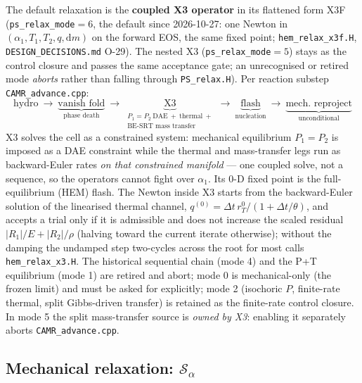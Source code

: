 \documentclass[11pt,a4paper]{article}
\newcommand{\code}[1]{\texttt{\small #1}}
\newcommand{\src}[1]{{\color{gray}\code{#1}}}
\begin{document}
The default relaxation is the \textbf{coupled X3 operator} in its
flattened form X3F (\code{ps\_relax\_mode}$=6$, the default since
2026-10-27: one Newton in $(\alpha_1, T_1, T_2, q, \mathrm{d}m)$ on the
forward EOS, the same fixed point; \src{hem\_relax\_x3f.H},
\code{DESIGN\_DECISIONS.md} O-29).  The nested X3
(\code{ps\_relax\_mode}$=5$) stays as the control closure and passes the
same acceptance gate; an unrecognised or retired mode \emph{aborts} rather
than falling through \src{PS\_relax.H}).  Per reaction substep
\src{CAMR\_advance.cpp}:
\begin{equation}
  \text{hydro}\ \longrightarrow\
  \underbrace{\text{vanish fold}}_{\text{phase death}}\ \longrightarrow\
  \underbrace{\text{X3}}_{\substack{P_1=P_2\ \text{DAE}\ +\ \text{thermal}\ +\\
                                    \text{BE-SRT mass transfer}}}\ \longrightarrow\
  \underbrace{\text{flash}}_{\text{nucleation}}\ \longrightarrow\
  \underbrace{\text{mech.\ reproject}}_{\text{unconditional}}
  \label{eq:chain}
\end{equation}
X3 solves the cell as a constrained system: mechanical equilibrium
$P_1\!=\!P_2$ is imposed as a DAE constraint while the thermal and
mass-transfer legs run as backward-Euler rates \emph{on that constrained
manifold} --- one coupled solve, not a sequence, so the operators cannot
fight over $\alpha_1$.  Its 0-D fixed point is the full-equilibrium (HEM)
flash.  The Newton inside X3 starts from the backward-Euler solution of the
linearised thermal channel, $q^{(0)}=\Delta t\,r_T^0/(1+\Delta t/\theta)$,
and accepts a trial only if it is admissible and does not increase the
scaled residual $|R_1|/E+|R_2|/\rho$ (halving toward the current iterate
otherwise); without the damping the undamped step two-cycles across the
root for most calls \src{hem\_relax\_x3.H}.  The historical sequential
chain (mode 4) and the P+T equilibrium (mode 1) are retired and abort;
mode 0 is mechanical-only (the frozen limit) and must be asked for
explicitly; mode 2 (isochoric $P$, finite-rate thermal, split Gibbs-driven
transfer) is retained as the finite-rate control closure.  In mode 5 the
split mass-transfer source is \emph{owned by X3}: enabling it separately
aborts \src{CAMR\_advance.cpp}.

\subsection{Mechanical relaxation: $\mathcal{S}_\alpha$}
\end{document}
